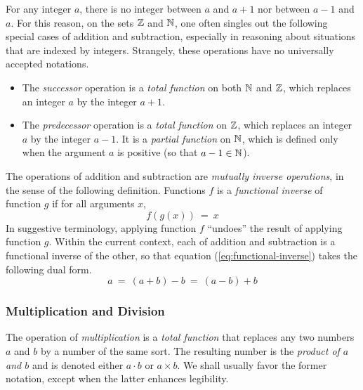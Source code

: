 For any integer $a$, there is no integer between $a$ and $a+1$ nor
between $a-1$ and $a$.  For this reason, on the sets $\mathbb{Z}$ and $\mathbb{N}$,
one often singles out the following special cases of addition and
subtraction, especially in reasoning about situations that are indexed
by integers.  Strangely, these operations have no universally accepted
notations.
\begin{itemize}
\item
The {\it successor} operation is
a {\em total function} on both $\mathbb{N}$ and $\mathbb{Z}$, which replaces an
integer $a$ by the integer $a+1$.
\item
The {\it predecessor} operation
is a {\em total function} on $\mathbb{Z}$, which replaces an integer $a$ by
the integer $a-1$.  It is a {\em partial function} on $\mathbb{N}$, which is
defined only when the argument $a$ is positive (so that $a-1 \in \mathbb{N}$).
\end{itemize}

The operations of addition and subtraction are {\em mutually inverse
  operations}, in the sense of the following definition.  Functions
$f$ is a {\it functional inverse} of
function $g$ if for all arguments $x$,
\begin{equation}
\label{eq:functional-inverse}
f(g(x)) \ = \ x
\end{equation}
In suggestive terminology, applying function $f$ ``undoes'' the result
of applying function $g$.  Within the current context, each of
addition and subtraction is a functional inverse of the other, so that
equation (\ref{eq:functional-inverse}) takes the following dual form.
\[
a \ = \ (a+b) -b \ = \ (a-b) +b
\]

\subsubsection{Multiplication and Division}

The operation of {\it multiplication}
is a {\em total function} that replaces any two numbers $a$ and $b$ by
a number of the same sort.  The resulting number is the {\em product
  of $a$ and $b$} and is
denoted either $a \cdot b$ 
or $a \times b$.
We shall usually favor the former notation, except when the latter
enhances legibility.

